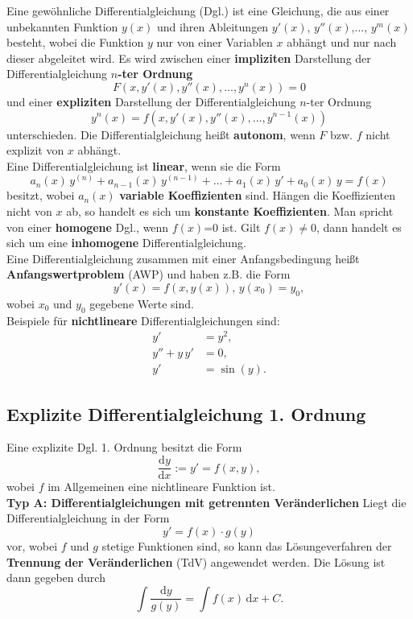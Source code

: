 Eine gew\"ohnliche Differentialgleichung (Dgl.) ist eine Gleichung, die aus einer unbekannten Funktion $y(x)$ und ihren Ableitungen $y'(x)$, $y''(x)$,..., $y^m(x)$ besteht, wobei die Funktion $y$ nur von einer Variablen $x$ abh\"angt und nur nach dieser abgeleitet wird. Es wird zwischen einer \textbf{impliziten} Darstellung der Differentialgleichung \textbf{$n$-ter Ordnung}
$$
F(x, y'(x), y''(x),..., y^n(x)) =0
$$
und einer \textbf{expliziten} Darstellung der Differentialgleichung $n$-ter Ordnung
$$
y^n(x) = f(x, y'(x), y''(x),..., y^{n-1}(x)) 
$$
unterschieden. Die Differentialgleichung hei\ss t \textbf{autonom}, wenn $F$ bzw. $f$ nicht explizit von $x$ abh\"angt. \\

\noindent
Eine Differentialgleichung ist \textbf{linear}, wenn sie die Form
$$
a_n(x)\, y^{(n)} + a_{n-1}(x)\, y^{(n-1)} + \dots + a_1(x)\, y' + a_0(x)\, y = f(x)
$$
besitzt, wobei $a_n(x)$ \textbf{variable Koeffizienten} sind. H\"angen die Koeffizienten nicht von $x$ ab, so handelt es sich um \textbf{konstante Koeffizienten}.
Man spricht von einer \textbf{homogene} Dgl., wenn $f(x)$=0 ist. Gilt $f(x) \neq 0$, dann handelt es sich um eine \textbf{inhomogene} Differentialgleichung.\\

\noindent
Eine Differentialgleichung zusammen mit einer Anfangsbedingung hei\ss t \textbf{Anfangswertproblem} (AWP) und haben z.B. die Form
$$
y'(x)=f(x,y(x)), \,  y(x_0) = y_0,
$$
wobei $x_0$ und $y_0$ gegebene Werte sind.\\

\noindent
Beispiele f\"ur \textbf{nichtlineare} Differentialgleichungen sind:
\begin{align*}
y' &= y^2, \\
y'' +y \, y' &= 0,\\
y' &= \sin(y).
\end{align*}

\subsection*{Explizite Differentialgleichung 1. Ordnung}
Eine explizite Dgl. 1. Ordnung besitzt die Form
$$
\dfrac{\mathrm{d}y}{\mathrm{d}x}:= y' = f(x,y),
$$
wobei $f$ im Allgemeinen eine nichtlineare Funktion ist. \\
\noindent
\textbf{Typ A: Differentialgleichungen mit getrennten Ver\"anderlichen}
Liegt die Differentialgleichung in der Form
$$
y' =f(x)\cdot g(y)
$$
vor, wobei $f$ und $g$ stetige Funktionen sind, so kann das L\"osungeverfahren der \textbf{Trennung der Ver\"anderlichen} (TdV) angewendet werden. Die L\"osung ist dann gegeben durch
$$
\int \dfrac{\mathrm{d}y}{g(y)} = \int f(x) \, \mathrm{d}x +C.
$$

